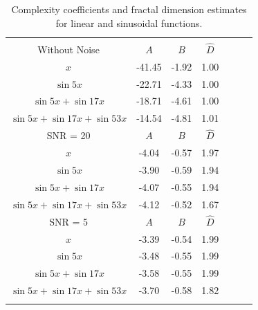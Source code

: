 \begin{table}[!htbp] \centering 
\begin{tabular}{@{\extracolsep{1pt}} ccccccc} 
\\[-1.8ex]\hline 
\hline \\[-1.8ex] 
Without Noise     &  $A$ & $B$  & $\hat D$ \\ \hline 
        $x $    &    -41.45 & -1.92  & 1.00\\ 
 $\sin 5x$  &
                  -22.71 & -4.33 & 1.00 \\ 
 $\sin 5x  + \sin 17x$ &
                  -18.71 & -4.61 & 1.00 \\ 
 $\sin 5x  + \sin 17x + \sin 53x $ &
                  -14.54 & -4.81 & 1.01 
 \\ \hline  
%    
SNR = 20  & $A$ & $B$ & $\hat D$ \\  \hline
$x  $ &
   -4.04  & -0.57   &  1.97 \\  
 $\sin 5x   $ &  
   -3.90  & -0.59   &  1.94 \\  
 $\sin 5x  + \sin 17x  $ &
   -4.07  & -0.55   &  1.94 \\  
$\sin 5x  + \sin 17x + \sin 53x $ & 
   -4.12  & -0.52   &  1.67 
\\ \hline 
SNR = 5    & $A$ & $B$& $\hat D$  \\ \hline
$ x$ &
 -3.39 & -0.54   &  1.99  \\ 
 $\sin 5x $ &
 -3.48 & -0.55   &  1.99  \\ 
 $\sin 5x  + \sin 17x $ &
 -3.58 & -0.55   &  1.99  \\ 
 $\sin 5x  + \sin 17x + \sin 53x $ &
 -3.70 & -0.58   &  1.82  \\
 \hline \\[-1.8ex] 
    \end{tabular}
  \caption{Complexity coefficients and fractal dimension
  estimates for linear and sinusoidal functions.}\label{tab:simple-coeffs}  
\end{table}

